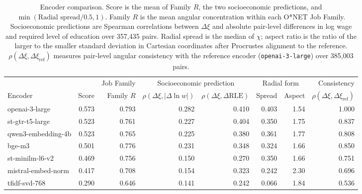 \begin{table}[t]
\centering
\caption{Encoder comparison. Score is the mean of Family $R$, the two socioeconomic predictions, and $\min(\text{Radial spread}/0.5, 1)$. Family $R$ is the mean angular concentration within each O*NET Job Family. Socioeconomic predictions are Spearman correlations between $\Delta\xi$ and absolute pair-level differences in log wage and required level of education over 357,435 pairs. Radial spread is the median of $\chi$; aspect ratio is the ratio of the larger to the smaller standard deviation in Cartesian coordinates after Procrustes alignment to the reference. $\rho(\Delta\xi, \Delta\xi_{\mathrm{ref}})$ measures pair-level angular consistency with the reference encoder (\texttt{openai-3-large}) over 385,003 pairs.}
\label{tab:encoder_robustness}
\footnotesize
\begin{tabular}{lrrrrrrr}
\toprule
 & & Job Family & \multicolumn{2}{c}{Socioeconomic prediction} & \multicolumn{2}{c}{Radial form} & Consistency \\
\cmidrule(lr){4-5} \cmidrule(lr){6-7}
Encoder & Score & Family $R$ & $\rho(\Delta\xi, |\Delta\ln w|)$ & $\rho(\Delta\xi, \Delta\mathrm{RLE})$ & Spread & Aspect & $\rho(\Delta\xi, \Delta\xi_{\mathrm{ref}})$ \\
\midrule
openai-3-large & 0.573 & 0.793 & 0.282 & 0.410 & 0.403 & 1.54 & 1.000 \\
st-gtr-t5-large & 0.523 & 0.761 & 0.227 & 0.404 & 0.350 & 1.75 & 0.837 \\
qwen3-embedding-4b & 0.523 & 0.765 & 0.225 & 0.380 & 0.361 & 1.77 & 0.808 \\
bge-m3 & 0.501 & 0.776 & 0.231 & 0.348 & 0.324 & 1.66 & 0.850 \\
st-minilm-l6-v2 & 0.469 & 0.756 & 0.150 & 0.270 & 0.350 & 1.66 & 0.751 \\
mistral-embed-norm & 0.417 & 0.708 & 0.154 & 0.323 & 0.242 & 2.30 & 0.696 \\
tfidf-svd-768 & 0.290 & 0.646 & 0.141 & 0.242 & 0.066 & 1.84 & 0.536 \\
\bottomrule
\end{tabular}
\end{table}
